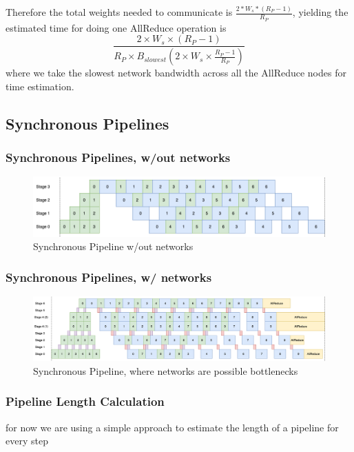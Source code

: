 \documentclass[11pt]{article}
\begin{document}
Therefore the total weights needed to communicate is \(\frac{2*W_s * (R_P-1)}{R_P}\), yielding the estimated time for doing one AllReduce operation is
$$\frac{2 \times W_s \times (R_P-1)}{R_P \times B_{slowest}(2 \times W_s \times  \frac{R_P-1}{R_P})}$$
where we take the slowest network bandwidth across all the AllReduce nodes for time estimation. 

\subsection{Synchronous Pipelines}
\label{sec:org01adfc1}
\subsubsection{Synchronous Pipelines, w/out networks}
\label{sec:org06674ed}
\begin{figure}[htbp]
\centering
\includegraphics[width=.9\linewidth]{../images/HPGO-Pipeline-no-network.png}
\caption{\label{fig:HPGO-Pipeline-no-network}
Synchronous Pipeline w/out networks}
\end{figure}
\subsubsection{Synchronous Pipelines, w/ networks}
\label{sec:org6220e3c}
\begin{figure}[htbp]
\centering
\includegraphics[width=.9\linewidth]{../images/HPGO-Pipeline.png}
\caption{\label{fig:HPGO-Pipeline}
Synchronous Pipeline, where networks are possible bottlenecks}
\end{figure}
\subsubsection{Pipeline Length Calculation}
\label{sec:org8aa1614}
for now we are using a simple approach to estimate the length of a pipeline for every step
\end{document}
